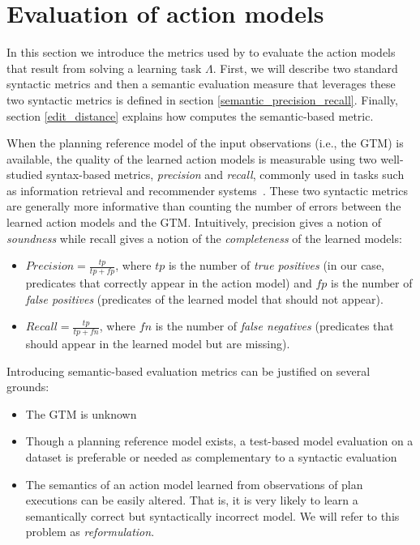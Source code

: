 
\section{Evaluation of action models}
\label{sec:evaluation}

In this section we introduce the metrics used by \FAMA to evaluate the action models that result from solving a learning task $\Lambda$. First, we will describe two standard syntactic metrics and then a semantic evaluation measure that leverages these two syntactic metrics is defined in section \ref{semantic_precision_recall}. Finally, section \ref{edit_distance} explains how \FAMA computes the semantic-based metric.

\vspace{0.1cm}

When the planning reference model of the input observations (i.e., the GTM) is available, the quality of the learned action models is measurable using two well-studied syntax-based metrics, {\em precision} and {\em recall}, commonly used in tasks such as information retrieval and recommender systems~\cite{davis2006relationship}. These two syntactic metrics are generally more informative than counting the number of errors between the learned action models and the GTM. Intuitively, precision gives a notion of {\em soundness} while recall gives a notion of the {\em completeness} of the learned models:

\begin{itemize}
\item $Precision=\frac{tp}{tp+fp}$, where $tp$ is the number of {\em true positives} (in our case, predicates that correctly appear in the action model) and $fp$ is the number of {\em false positives} (predicates of the learned model that should not appear).
\item $Recall=\frac{tp}{tp+fn}$, where $fn$ is the number of {\em false negatives} (predicates that should appear in the learned model but are missing).
\end{itemize}


Introducing semantic-based evaluation metrics can be justified on several grounds:

\begin{itemize}
\item The GTM is unknown
\item Though a planning reference model exists, a test-based model evaluation on a dataset is preferable or needed as complementary to a syntactic evaluation
\item The semantics of an action model learned from observations of plan executions can be easily altered. That is, it is very likely to learn a semantically correct but syntactically incorrect model. We will refer to this problem as \emph{reformulation}.
\end{itemize}


